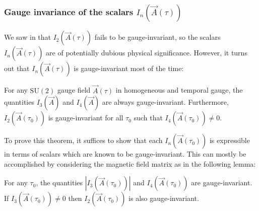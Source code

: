 \subsubsection*{Gauge invariance of the scalars $I_{n}(\vec{A}(\tau))$}

We saw in  that $I_{2}(\vec{A}(\tau))$ fails to be gauge-invariant, so the scalars $I_{n}(\vec{A}(\tau))$ are of potentially dubious physical significance. However, it turns out that $I_{n}(\vec{A}(\tau))$ is gauge-invariant most of the time:
\begin{thm}
\label{thm:scalars-are-gauge-invt}For any $\mathrm{SU}(2)$ gauge field $\vec{A}(\tau)$ in homogeneous and temporal gauge, the quantities $I_{3}(\vec{A})$ and $I_{4}(\vec{A})$ are always gauge-invariant. Furthermore, $I_{2}(\vec{A}(\tau_{0}))$ is gauge-invariant for all $\tau_{0}$ such that $I_{4}(\vec{A}(\tau_{0}))\neq0$.
\end{thm}

To prove this theorem, it suffices to show that each $I_{n}(\vec{A}(\tau_{0}))$ is expressible in terms of scalars which are known to be gauge-invariant. This can mostly be accomplished by considering the magnetic field matrix as in the following lemma:
\begin{lem}
\label{lem:scalars-gauge-invt}For any $\tau_{0}$, the quantities $\left|I_{3}(\vec{A}(\tau_{0}))\right|$ and $I_{4}(\vec{A}(\tau_{0}))$ are gauge-invariant. If $I_{3}(\vec{A}(\tau_{0}))\neq0$ then $I_{2}(\vec{A}(\tau_{0}))$ is also gauge-invariant.
\end{lem}

